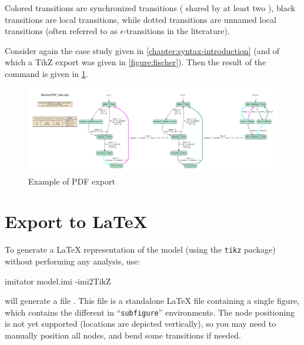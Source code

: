 Colored transitions are synchronized transitions (\ie{} shared by at least two \IPTA{}), black transitions are local transitions, while dotted transitions are unnamed local transitions (often referred to as $\epsilon$-transitions in the literature).

\begin{example}
	Consider again the case study given in \cref{chapter:syntax-introduction} (and of which a TikZ export was given in \cref{figure:fischer}).
	Then the result of the  command is given in \cref{figure:PDF-export}.
\end{example}

\begin{figure}
	\includegraphics[width=\textwidth]{include/fischerPAT_obs-pta.pdf}

	\caption{Example of PDF export}
	\label{figure:PDF-export}
\end{figure}




\section{Export to \LaTeX{}}

To generate a \LaTeX{} representation of the \NIPTA{} model (using the \texttt{tikz} package) without performing any analysis, use:

\begin{terminal}
imitator model.imi -imi2TikZ
\end{terminal}

\imitator{} will generate a file .
This file is a standalone \LaTeX{} file containing a single figure, which contains the different \IPTA{} in ``\texttt{subfigure}'' environments.
The node positioning is not yet supported (locations are depicted vertically), so you may need to manually position all nodes, and bend some transitions if needed.


